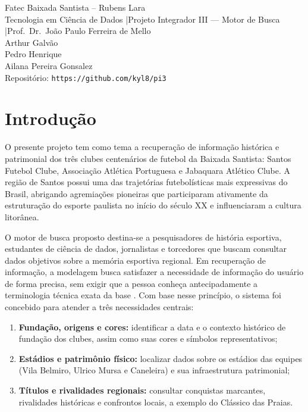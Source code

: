 \documentclass[
  article,
  12pt,
  oneside,
  a4paper,
  english,
  brazil
]{abntex2}\usepackage[]{graphicx}\usepackage[]{xcolor}
\newcommand{\nomecurso}{Tecnologia em Ciência de Dados}
\newcommand{\nomedisciplina}{Projeto Integrador III --- Motor de Busca}
\newcommand{\nomeprofessor}{Prof.\ Dr.\ João Paulo Ferreira de Mello}
\newcommand{\repositorio}{https://github.com/kyl8/pi3}
\newcommand{\integrantes}{%
  Arthur Galvão \\
  Pedro Henrique \\
  Ailana Pereira Gonsalez%
}
\begin{document}
\frenchspacing

\maketitle

\begin{center}
  \small
  Fatec Baixada Santista -- Rubens Lara \\
  \nomecurso{} \quad|\quad \nomedisciplina{} \quad|\quad \nomeprofessor{} \\[0.3em]
  \integrantes \\[0.3em]
  Repositório: \texttt{\repositorio}
\end{center}



\textual

\section{Introdução}

O presente projeto tem como tema a recuperação de informação histórica e patrimonial dos três clubes centenários de futebol da Baixada Santista: Santos Futebol Clube, Associação Atlética Portuguesa e Jabaquara Atlético Clube. A região de Santos possui uma das trajetórias futebolísticas mais expressivas do Brasil, abrigando agremiações pioneiras que participaram ativamente da estruturação do esporte paulista no início do século XX e influenciaram a cultura litorânea.

O motor de busca proposto destina-se a pesquisadores de história esportiva, estudantes de ciência de dados, jornalistas e torcedores que buscam consultar dados objetivos sobre a memória esportiva regional. Em recuperação de informação, a modelagem busca satisfazer a necessidade de informação do usuário de forma precisa, sem exigir que a pessoa conheça antecipadamente a terminologia técnica exata da base \cite[cap.~1]{manning2008}. Com base nesse princípio, o sistema foi concebido para atender a três necessidades centrais:
\begin{enumerate}
  \item \textbf{Fundação, origens e cores:} identificar a data e o contexto histórico de fundação dos clubes, assim como suas cores e símbolos representativos;
  \item \textbf{Estádios e patrimônio físico:} localizar dados sobre os estádios das equipes (Vila Belmiro, Ulrico Mursa e Caneleira) e sua infraestrutura patrimonial;
  \item \textbf{Títulos e rivalidades regionais:} consultar conquistas marcantes, rivalidades históricas e confrontos locais, a exemplo do Clássico das Praias.
\end{enumerate}
\end{document}
